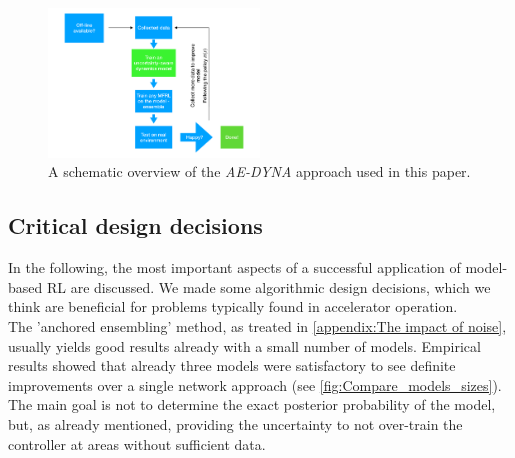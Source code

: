 \documentclass[
reprint,
amsmath,amssymb,amsfonts,clevref,
aps,
prstab,
]{revtex4-2}
\begin{document}
	\begin{figure}[!h]
		\centering
		\includegraphics*[width=0.5\textwidth]{Figures/MBRL_overview}
		\caption{A schematic overview of the \emph{AE-DYNA} approach used in this paper.}
		\label{fig:MBRL_overview}
	\end{figure}
	\subsection{Critical design decisions}\label{ss:critical_design}
In the following, the most important aspects of a successful application of model-based RL are discussed. We made some algorithmic design decisions, which we think are beneficial for problems typically found in accelerator operation.\\
The 'anchored ensembling' method, as treated in \cref{appendix:The impact of noise}, usually yields good results already with a small number of models. Empirical results showed that already three models were satisfactory to see definite improvements over a single network approach (see \cref{fig:Compare_models_sizes}). The main goal is not to determine the exact posterior probability of the model, but, as already mentioned, providing the uncertainty to not over-train the controller at areas without sufficient data.\\
\end{document}
